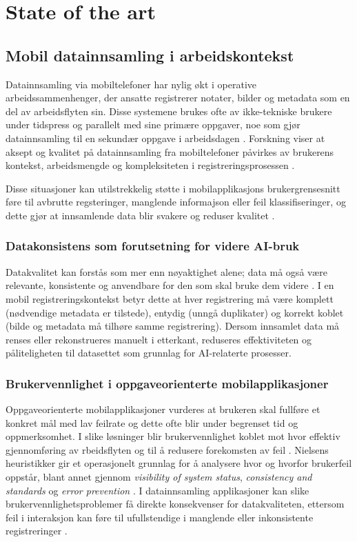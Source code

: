 \chapter{State of the art}
\label{chap:state}

\section{Mobil datainnsamling i arbeidskontekst}
\label{sec:sota}

Datainnsamling via mobiltelefoner har nylig økt i operative arbeidssammenhenger, der ansatte registrerer notater, bilder og metadata som en del av arbeidsflyten sin. Disse systemene brukes ofte av ikke-tekniske brukere under tidspress og parallelt med sine primære oppgaver, noe som gjør datainnsamling til en sekundær oppgave i arbeidsdagen \cite{wenz2023}. Forskning viser at aksept og kvalitet på datainnsamling fra mobiltelefoner påvirkes av brukerens kontekst, arbeidsmengde og kompleksiteten i registreringsprosessen \cite{wenz2023}.

Disse situasjoner kan utilstrekkelig støtte i mobilapplikasjons brukergrensesnitt føre til avbrutte regsteringer, manglende informajson eller feil klassifiseringer, og dette gjør at innsamlende data blir svakere og reduser kvalitet \cite{muller2024}. 

\subsection{Datakonsistens som forutsetning for videre AI-bruk}
Datakvalitet kan forstås som mer enn nøyaktighet alene; data må også være relevante, konsistente og anvendbare for den som skal bruke dem videre \cite{wang1996}. I en mobil registreringskontekst betyr dette at hver registrering må være komplett (nødvendige metadata er tilstede), entydig (unngå duplikater) og korrekt koblet (bilde og metadata må tilhøre samme registrering). Dersom innsamlet data må renses eller rekonstrueres manuelt i etterkant, reduseres effektiviteten og påliteligheten til datasettet som grunnlag for AI-relaterte prosesser.

\subsection{Brukervennlighet i oppgaveorienterte mobilapplikasjoner}
Oppgaveorienterte mobilapplikasjoner vurderes at brukeren skal fullføre et konkret mål med lav feilrate og dette ofte blir under begrenset tid og oppmerksomhet. I slike løsninger blir brukervennlighet koblet mot hvor effektiv gjennomføring av rbeidsflyten og til å redusere forekomsten av feil \cite{weichbroth2024}. Nielsens heuristikker gir et operasjonelt grunnlag for å analysere hvor og hvorfor brukerfeil oppstår, blant annet gjennom \textit{visibility of system status}, \textit{consistency and standards} og \textit{error prevention} \cite{nielsen1994}. 
I datainnsamling applikasjoner kan slike brukervennlighetsproblemer få direkte konsekvenser for datakvaliteten, ettersom feil i interaksjon kan føre til ufullstendige i manglende eller inkonsistente registreringer \cite{muller2024}. 

